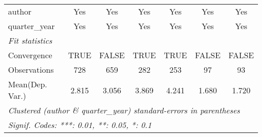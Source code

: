 \begin{tabular}{lcccccc}
   author                                & Yes          & Yes           & Yes         & Yes           & Yes            & Yes\\  
   quarter\_year                         & Yes          & Yes           & Yes         & Yes           & Yes            & Yes\\  
   \midrule
   \emph{Fit statistics}\\
   Convergence                           &TRUE          & FALSE         & TRUE        & TRUE          & FALSE          & FALSE\\  
   Observations                          & 728          & 659           & 282         & 253           & 97             & 93\\  
Mean(Dep. Var.) & 2.815 & 3.056 & 3.869 & 4.241 & 1.680 & 1.720 \\
   \midrule \midrule
   \multicolumn{7}{l}{\emph{Clustered (author \& quarter\_year) standard-errors in parentheses}}\\
   \multicolumn{7}{l}{\emph{Signif. Codes: ***: 0.01, **: 0.05, *: 0.1}}\\
\end{tabular}
\par\endgroup
